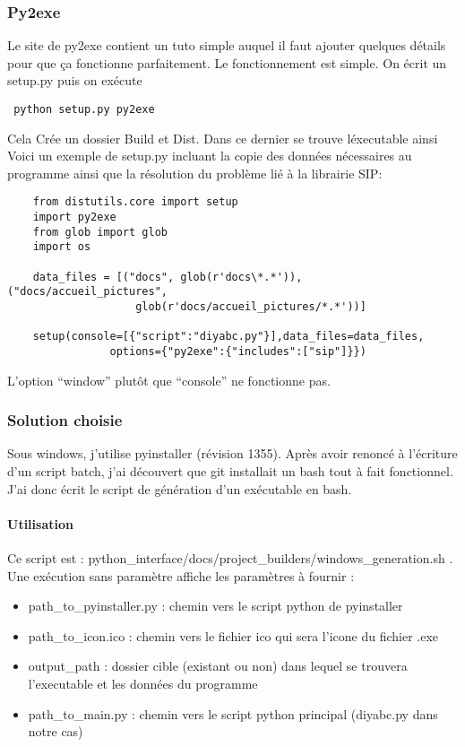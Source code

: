 \documentclass[12pt,a4paper]{article}
\begin{document}
        \subsubsection{Py2exe}
        Le site de py2exe contient un tuto simple auquel il faut ajouter
        quelques d\'etails pour que ça fonctionne parfaitement. Le
        fonctionnement est simple. On \'ecrit un setup.py puis on ex\'ecute
        \begin{verbatim} python setup.py py2exe \end{verbatim} Cela Cr\'ee un
        dossier Build et Dist. Dans ce dernier se trouve l\'executable ainsi
        Voici un exemple de setup.py incluant la copie des donn\'ees
        n\'ecessaires au programme ainsi que la r\'esolution du problème li\'e à
        la librairie SIP:
        \begin{verbatim}
    from distutils.core import setup
    import py2exe
    from glob import glob
    import os

    data_files = [("docs", glob(r'docs\*.*')),("docs/accueil_pictures",
                    glob(r'docs/accueil_pictures/*.*'))]

    setup(console=[{"script":"diyabc.py"}],data_files=data_files, 
                options={"py2exe":{"includes":["sip"]}})
        \end{verbatim}
        L'option ``window'' plutôt que ``console'' ne fonctionne pas.
        \subsubsection{Solution choisie}
        Sous windows, j'utilise pyinstaller (révision 1355). Après avoir renoncé
        à l'écriture d'un script batch, j'ai découvert que git installait un
        bash tout à fait fonctionnel. J'ai donc écrit le script de génération
        d'un exécutable en bash.
        \paragraph{Utilisation}

        Ce script est : python\_interface/docs/project\_builders/windows\_generation.sh . Une 
        exécution sans paramètre affiche les paramètres à fournir : \\

        \begin{itemize}
            \item path\_to\_pyinstaller.py : chemin vers le script python de pyinstaller
            \item path\_to\_icon.ico : chemin vers le fichier ico qui sera l'icone du fichier .exe
            \item output\_path : dossier cible (existant ou non) dans lequel se trouvera l'executable et les données du programme
            \item path\_to\_main.py : chemin vers le script python principal (diyabc.py dans notre cas)\\
        \end{itemize}
\end{document}
